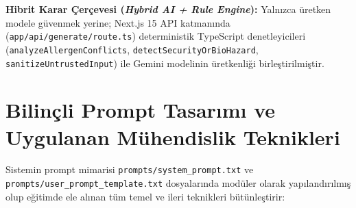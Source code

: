 \documentclass[9pt,a4paper]{article}
\begin{document}
\textbf{Hibrit Karar Çerçevesi (\emph{Hybrid AI + Rule Engine}):} Yalnızca üretken modele güvenmek yerine; Next.js 15 API katmanında (\texttt{app/api/generate/route.ts}) deterministik TypeScript denetleyicileri (\texttt{analyzeAllergenConflicts}, \texttt{detectSecurityOrBioHazard}, \texttt{sanitizeUntrustedInput}) ile Gemini modelinin üretkenliği birleştirilmiştir.

\section{Bilinçli Prompt Tasarımı ve Uygulanan Mühendislik Teknikleri}
Sistemin prompt mimarisi \texttt{prompts/system\_prompt.txt} ve \texttt{prompts/user\_prompt\_template.txt} dosyalarında modüler olarak yapılandırılmış olup eğitimde ele alınan tüm temel ve ileri teknikleri bütünleştirir:
\end{document}
